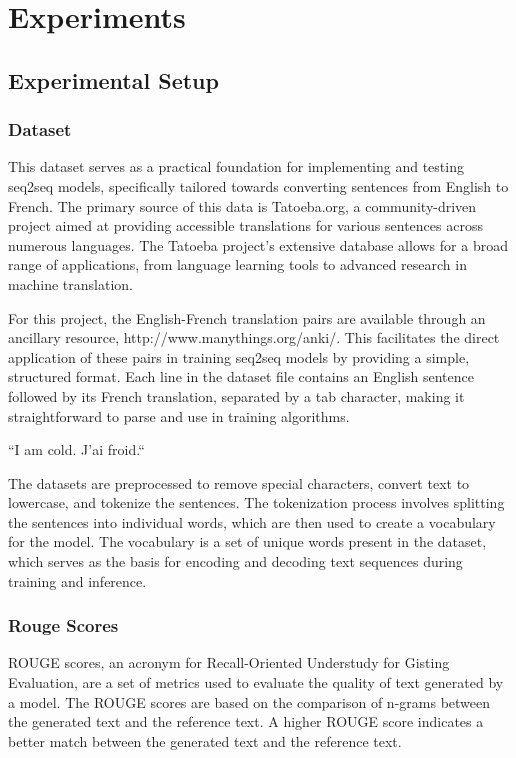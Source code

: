 \documentclass{article}
\begin{document}
\section{Experiments}
\subsection{Experimental Setup}
\subsubsection{Dataset}
This dataset serves as a practical foundation for implementing and testing seq2seq models, specifically tailored towards converting sentences from English to French. The primary source of this data is Tatoeba.org, a community-driven project aimed at providing accessible translations for various sentences across numerous languages. The Tatoeba project's extensive database allows for a broad range of applications, from language learning tools to advanced research in machine translation.

For this project, the English-French translation pairs are available through an ancillary resource, http://www.manythings.org/anki/. This facilitates the direct application of these pairs in training seq2seq models by providing a simple, structured format. Each line in the dataset file contains an English sentence followed by its French translation, separated by a tab character, making it straightforward to parse and use in training algorithms.

    ``I am cold.    J'ai froid.``

The datasets are preprocessed to remove special characters, convert text to lowercase, and tokenize the sentences. The tokenization process involves splitting the sentences into individual words, which are then used to create a vocabulary for the model. The vocabulary is a set of unique words present in the dataset, which serves as the basis for encoding and decoding text sequences during training and inference.

\subsubsection{Rouge Scores}
ROUGE scores, an acronym for Recall-Oriented Understudy for Gisting Evaluation, are a set of metrics used to evaluate the quality of text generated by a model. The ROUGE scores are based on the comparison of n-grams between the generated text and the reference text. A higher ROUGE score indicates a better match between the generated text and the reference text.
\end{document}
